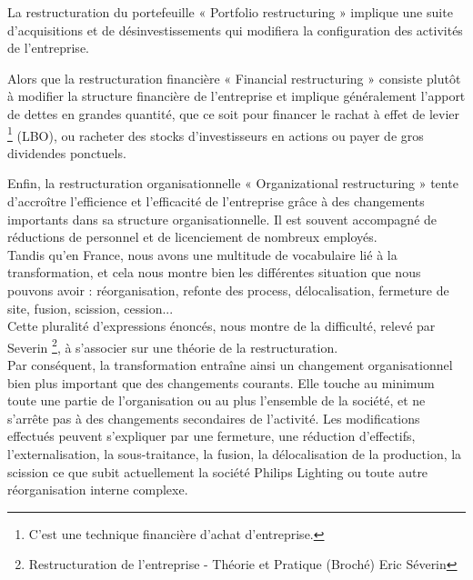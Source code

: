 \documentclass[12pt,a4paper]{article}
\begin{document}
La restructuration du portefeuille « Portfolio restructuring » implique une suite d'acquisitions et de désinvestissements qui modifiera la configuration des activités de l'entreprise.

 
Alors que la restructuration financière « Financial restructuring » consiste plutôt à modifier la structure financière de l'entreprise et implique généralement l'apport de dettes en grandes quantité, que ce soit pour financer le rachat à effet de levier \footnote{C'est une technique financière d'achat d'entreprise.} (LBO), ou racheter des stocks d'investisseurs en actions ou payer de gros dividendes ponctuels.
 

Enfin, la restructuration organisationnelle « Organizational restructuring » tente d'accroître l'efficience et l'efficacité de l'entreprise grâce à des changements importants dans sa structure organisationnelle. Il est souvent accompagné de réductions de personnel et de licenciement de nombreux employés.\\

 
 
Tandis qu'en France, nous avons une multitude de vocabulaire lié à la transformation, et cela nous montre bien les différentes situation que nous pouvons avoir : réorganisation, refonte des process, délocalisation, fermeture de site, fusion, scission, cession...\\
 
Cette pluralité d'expressions énoncés, nous montre de la difficulté, relevé par Severin \footnote{Restructuration de l'entreprise - Théorie et Pratique (Broché)
Eric Séverin}, à s'associer sur une théorie de la restructuration.\\

Par conséquent, la transformation entraîne ainsi un changement organisationnel bien plus important que des changements courants. Elle touche au minimum toute une partie de l’organisation ou au plus l'ensemble de la société, et ne s'arrête pas à des changements secondaires de l’activité. Les modifications effectués peuvent s'expliquer par une fermeture, une réduction d’effectifs, l’externalisation, la sous-traitance, la fusion, la délocalisation de la production, la scission ce que subit actuellement la société Philips Lighting  ou toute autre réorganisation interne complexe.
\end{document}

